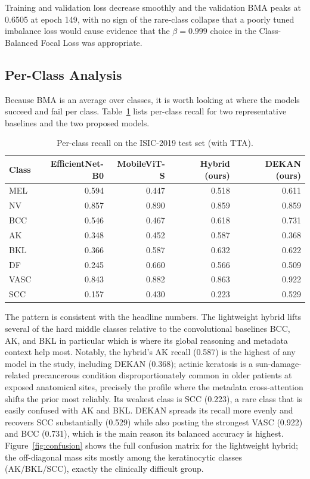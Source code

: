 Training and validation loss decrease smoothly and the
validation BMA peaks at 0.6505 at epoch 149, with no sign of the rare-class
collapse that a poorly tuned imbalance loss would cause evidence that the
$\beta=0.999$ choice in the Class-Balanced Focal Loss was appropriate.

\subsection{Per-Class Analysis}

Because BMA is an average over classes, it is worth looking at where the models
succeed and fail per class. Table~\ref{tab:perclass} lists per-class recall for
two representative baselines and the two proposed models.

\begin{table}[!t]
\centering
\caption{Per-class recall on the ISIC-2019 test set (with TTA).}
\label{tab:perclass}
\begin{tabular}{lrrrr}
\toprule
Class & EfficientNet-B0 & MobileViT-S & Hybrid (ours) & DEKAN (ours) \\
\midrule
MEL  & 0.594 & 0.447 & 0.518 & 0.611 \\
NV   & 0.857 & 0.890 & 0.859 & 0.859 \\
BCC  & 0.546 & 0.467 & 0.618 & 0.731 \\
AK   & 0.348 & 0.452 & 0.587 & 0.368 \\
BKL  & 0.366 & 0.587 & 0.632 & 0.622 \\
DF   & 0.245 & 0.660 & 0.566 & 0.509 \\
VASC & 0.843 & 0.882 & 0.863 & 0.922 \\
SCC  & 0.157 & 0.430 & 0.223 & 0.529 \\
\bottomrule
\end{tabular}
\end{table}

The pattern is consistent with the headline numbers. The lightweight hybrid lifts
several of the hard middle classes relative to the convolutional baselines
BCC, AK, and BKL in particular which is where its global reasoning and
metadata context help most. Notably, the hybrid's AK recall (0.587) is the
highest of any model in the study, including DEKAN (0.368); actinic keratosis
is a sun-damage-related precancerous condition disproportionately common in
older patients at exposed anatomical sites, precisely the profile where the
metadata cross-attention shifts the prior most reliably. Its weakest class is
SCC (0.223), a rare class that is easily confused with AK and BKL. DEKAN spreads its recall more evenly and
recovers SCC substantially (0.529) while also posting the strongest VASC (0.922)
and BCC (0.731), which is the main reason its balanced accuracy is highest.
Figure~\ref{fig:confusion} shows the full confusion matrix for the lightweight
hybrid; the off-diagonal mass sits mostly among the keratinocytic classes
(AK/BKL/SCC), exactly the clinically difficult group.

